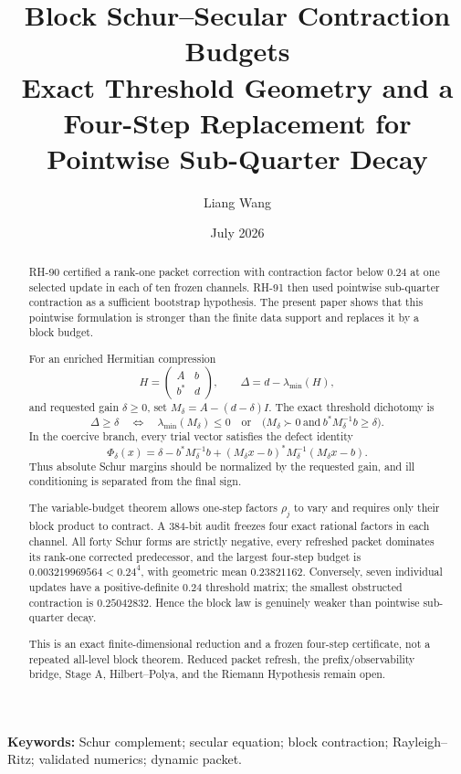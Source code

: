 \documentclass[11pt]{article}
\title{Block Schur--Secular Contraction Budgets\\
\large Exact Threshold Geometry and a Four-Step Replacement for Pointwise Sub-Quarter Decay}
\author{Liang Wang}
\date{July 2026}
\theoremstyle{definition}
\theoremstyle{remark}
\begin{document}
\maketitle

\begin{abstract}
RH-90 certified a rank-one packet correction with contraction factor below
$0.24$ at one selected update in each of ten frozen channels.  RH-91 then
used pointwise sub-quarter contraction as a sufficient bootstrap hypothesis.
The present paper shows that this pointwise formulation is stronger than the
finite data support and replaces it by a block budget.

For an enriched Hermitian compression
\[
 H=\begin{pmatrix}A&b\\b^*&d\end{pmatrix},\qquad
 \Delta=d-\lambda_{\min}(H),
\]
and requested gain $\delta\ge0$, set
$M_\delta=A-(d-\delta)I$.  The exact threshold dichotomy is
\[
 \Delta\ge\delta
 \quad\Longleftrightarrow\quad
 \lambda_{\min}(M_\delta)\le0
 \quad\text{or}\quad
 \bigl(M_\delta\succ0\ \text{and}\ b^*M_\delta^{-1}b\ge\delta\bigr).
\]
In the coercive branch, every trial vector satisfies the defect identity
\[
 \Phi_\delta(x)=
 \delta-b^*M_\delta^{-1}b
 +(M_\delta x-b)^*M_\delta^{-1}(M_\delta x-b).
\]
Thus absolute Schur margins should be normalized by the requested gain, and
ill conditioning is separated from the final sign.

The variable-budget theorem allows one-step factors $\rho_j$ to vary and
requires only their block product to contract.  A 384-bit audit freezes four
exact rational factors in each channel.  All forty Schur forms are strictly
negative, every refreshed packet dominates its rank-one corrected
predecessor, and the largest four-step budget is
$0.003219969564<0.24^4$, with geometric mean $0.23821162$.  Conversely,
seven individual updates have a positive-definite $0.24$ threshold matrix;
the smallest obstructed contraction is $0.25042832$.  Hence the block law is
genuinely weaker than pointwise sub-quarter decay.

This is an exact finite-dimensional reduction and a frozen four-step
certificate, not a repeated all-level block theorem.  Reduced packet refresh,
the prefix/observability bridge, Stage A, Hilbert--Polya, and the Riemann
Hypothesis remain open.
\end{abstract}

\noindent\textbf{Keywords:} Schur complement; secular equation; block
contraction; Rayleigh--Ritz; validated numerics; dynamic packet.
\end{document}
